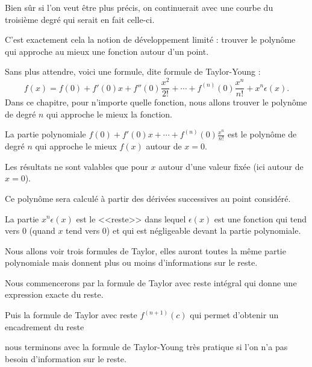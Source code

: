 \change

Bien sûr si l'on veut être plus précis, on continuerait avec une courbe du troisième degré 
qui serait en fait celle-ci.

\change

C'est exactement cela la notion de développement limité : trouver le polynôme qui approche au mieux une fonction
autour d'un point.


\diapo


Sans plus attendre, voici une  formule, dite formule de Taylor-Young :
$$f(x)= f(0)+f'(0)x+f''(0)\frac{x^2}{2!}+\cdots
+f^{(n)}(0)\frac{x^n}{n!} + x^n\epsilon(x).$$
Dans ce chapitre, pour n'importe quelle fonction, nous allons trouver le polynôme de degré $n$
qui approche le mieux la fonction. 

\change

La partie polynomiale $f(0)+f'(0)x+\cdots+f^{(n)}(0)\frac{x^n}{n!}$
est le polynôme de degré $n$ qui approche le mieux $f(x)$ autour de $x=0$.

\change

Les résultats ne sont valables que pour $x$ autour d'une valeur
fixée (ici autour de $x=0$). 


\change

Ce polynôme sera calculé à partir des dérivées successives au point
considéré. 

\change

La partie $x^n\epsilon(x)$ est le <<reste>>  dans lequel $\epsilon(x)$ est une fonction 
qui tend vers $0$ (quand $x$ tend vers $0$) et qui est négligeable 
devant la partie polynomiale.

\change

Nous allons voir trois formules de Taylor, elles auront toutes la même partie polynomiale
mais donnent plus ou moins d'informations sur le reste. 

\change

Nous commencerons par la formule de
Taylor avec reste intégral qui donne une expression exacte du reste.

\change

 Puis la formule de Taylor avec
reste $f^{(n+1)}(c)$ qui permet d'obtenir un encadrement du reste 


\change

nous terminons avec la formule de Taylor-Young
très pratique si l'on n'a pas besoin d'information sur le reste.

\change

